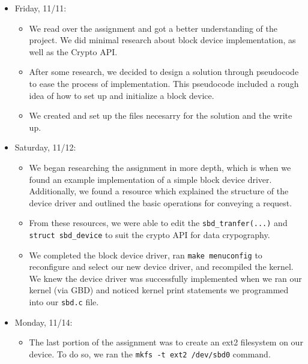 \documentclass[letterpaper,10pt,onecolumn]{IEEEtran}
\begin{document}
    
    \begin{itemize}
        \item Friday, 11/11:
            \begin{itemize}
                \item We read over the assignment and got a better understanding of the project. We did minimal research about block device implementation, as well as the Crypto API.
                \item After some research, we decided to design a solution through pseudocode to ease the process of implementation. This pseudocode included a rough idea of how to set up and initialize a block device.
                \item We created and set up the files necesarry for the solution and the write up.
            \end{itemize}
        \item Saturday, 11/12:
            \begin{itemize} 
                \item We began researching the assignment in more depth, which is when we found an example implementation of a simple block device driver. Additionally, we found a resource which explained the structure of the device driver and outlined the basic operations for conveying a request.
                \item From these resources, we were able to edit the \texttt{sbd\_tranfer(...)} and \texttt{struct sbd\_device} to suit the crypto API for data crypography.
                \item We completed the block device driver, ran \texttt{make menuconfig} to reconfigure and select our new device driver, and recompiled the kernel. We knew the device driver was successfully implemented when we ran our kernel (via GBD) and noticed kernel print statements we programmed into our \texttt{sbd.c} file.
        	\end{itemize}
        \item Monday, 11/14:
            \begin{itemize} 
                \item The last portion of the assignment was to create an ext2 filesystem on our device. To do so, we ran the \texttt{mkfs -t ext2 /dev/sbd0} command.
        	\end{itemize}
    \end{itemize}
    
    
    \vspace{6mm}
    
\end{document}
